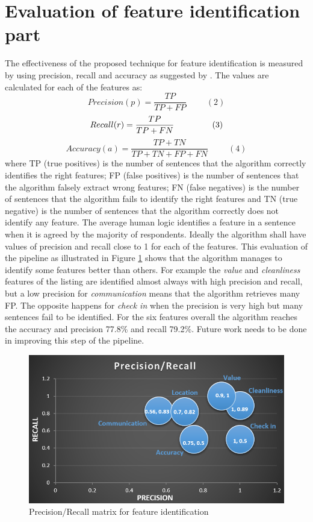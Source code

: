 \section{Evaluation of feature identification part}
The effectiveness of the proposed technique for feature identification is measured by using precision, recall and accuracy as suggested by \cite{huang2006performance}. The values are calculated for each of the features as:
$$ Precision  (p) =\frac{TP}{TP+FP}\hspace{1cm}(2)$$
$$ Recall  (r) = \frac{TP}{TP + FN}\hspace{1.6cm}(3) $$
$$ Accuracy (a) = \frac{TP + TN}{TP+TN+FP+FN} \hspace{1cm}(4)$$
where TP (true positives) is the number of sentences that the algorithm correctly identifies the right features; FP (false positives) is the number of sentences that the algorithm falsely extract wrong features; FN (false negatives) is the number of sentences that the algorithm fails to identify the right features and TN (true negative) is the number of sentences that the algorithm correctly does not identify any feature. The average human logic identifies a feature in a sentence when it is agreed by the majority of respondents. Ideally the algorithm shall have values of precision and recall close to 1 for each of the features. This evaluation of the pipeline as illustrated in Figure \ref{fig:matrix} shows that the algorithm manages to identify some features better than others. For example the \textit{value} and \textit{cleanliness} features of the listing are identified almost always with high precision and recall, but a low precision for \textit{communication} means that the algorithm retrieves many FP. The opposite happens for \textit{check in} when the precision is very high but many sentences fail to be identified. For the six features overall the algorithm reaches the accuracy and precision 77.8\% and recall 79.2\%. Future work needs to be done in improving this step of the pipeline.
\begin{figure}[h!]
	\centering
	\includegraphics{precision_recall_1}
	\caption{Precision/Recall matrix for feature identification}
	\label{fig:matrix}
\end{figure}